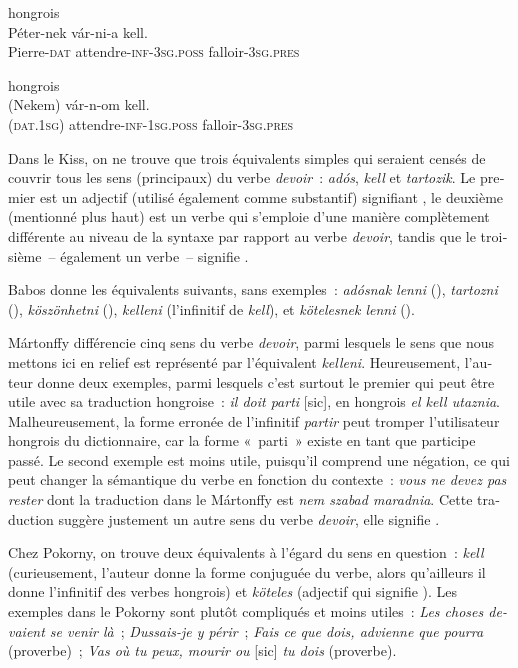\documentclass[output=paper,colorlinks,citecolor=brown,arabicfont,chinesefont,booklanguage=french]{langscibook}
\begin{document}
\begin{otherlanguage}{french}
\ea hongrois\\
\gll Péter-nek vár-ni-a kell.\\
     Pierre-\textsc{dat} attendre-\textsc{inf-3sg.poss} falloir-\textsc{3sg.pres}\\
\glt {}

\ex hongrois\\
\gll (Nekem) vár-n-om kell.\\
     (\textsc{dat.1sg}) attendre-\textsc{inf-1sg.poss} falloir-\textsc{3sg.pres}\\
\glt {}
\z

Dans le Kiss, on ne trouve que trois équivalents simples qui seraient censés de couvrir tous les sens (principaux) du verbe \emph{devoir}~: \emph{adós}, \emph{kell} et \emph{tartozik}. Le premier est un adjectif (utilisé également comme substantif) signifiant , le deuxième (mentionné plus haut) est un verbe qui s’emploie d’une manière complètement différente au niveau de la syntaxe par rapport au verbe \emph{devoir}, tandis que le troisième~-- également un verbe~-- signifie . 

Babos donne les équivalents suivants, sans exemples~: \emph{adósnak lenni} (), \emph{tartozni} (), \emph{köszönhetni} (), \emph{kelleni} (l’infinitif de \emph{kell}), et \emph{kötelesnek lenni} (). 

Mártonffy différencie cinq sens du verbe \emph{devoir}, parmi lesquels le sens que nous mettons ici en relief est représenté par l’équivalent \emph{kelleni}. Heureusement, l’auteur donne deux exemples, parmi lesquels c’est surtout le premier qui peut être utile avec sa traduction hongroise~: \emph{il doit parti} [sic], en hongrois \emph{el kell utaznia}. Malheureusement, la forme erronée de l’infinitif \emph{partir} peut tromper l’utilisateur hongrois du dictionnaire, car la forme «~parti~» existe en tant que participe passé. Le second exemple est moins utile, puisqu’il comprend une négation, ce qui peut changer la sémantique du verbe en fonction du contexte~: \emph{vous ne devez pas rester} dont la traduction dans le Mártonffy est \emph{nem szabad maradnia}. Cette traduction suggère justement un autre sens du verbe \emph{devoir}, elle signifie . 

Chez Pokorny, on trouve deux équivalents à l’égard du sens en question~: \emph{kell} (curieusement, l’auteur donne la forme conjuguée du verbe, alors qu’ailleurs il donne l’infinitif des verbes hongrois) et \emph{köteles} (adjectif qui signifie ). Les exemples dans le Pokorny sont plutôt compliqués et moins utiles~: \emph{Les choses devaient se venir là}~; \emph{Dussais-je y périr}~; \emph{Fais ce que dois, advienne que pourra} (proverbe)~; \emph{Vas où tu peux, mourir ou} [sic] \emph{tu dois} (proverbe).


\end{otherlanguage}
\end{document}
